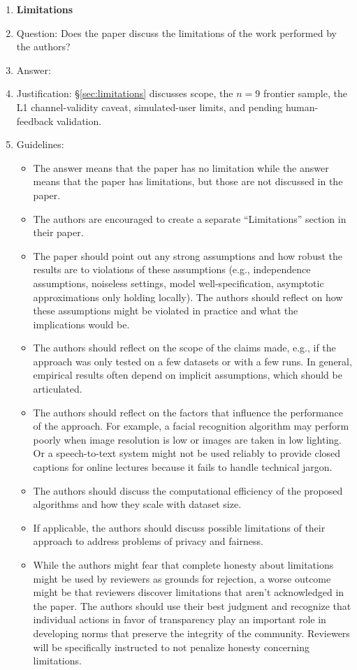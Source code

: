 \documentclass[11pt]{article}
\begin{document}
\begin{enumerate}
\item {\bf Limitations}
    \item[] Question: Does the paper discuss the limitations of the work performed by the authors?
    \item[] Answer: \answerYes{}
    \item[] Justification: \S\ref{sec:limitations} discusses scope, the $n{=}9$ frontier sample, the L1 channel-validity caveat, simulated-user limits, and pending human-feedback validation.
    \item[] Guidelines:
    \begin{itemize}
        \item The answer \answerNA{} means that the paper has no limitation while the answer \answerNo{} means that the paper has limitations, but those are not discussed in the paper.
        \item The authors are encouraged to create a separate ``Limitations'' section in their paper.
        \item The paper should point out any strong assumptions and how robust the results are to violations of these assumptions (e.g., independence assumptions, noiseless settings, model well-specification, asymptotic approximations only holding locally). The authors should reflect on how these assumptions might be violated in practice and what the implications would be.
        \item The authors should reflect on the scope of the claims made, e.g., if the approach was only tested on a few datasets or with a few runs. In general, empirical results often depend on implicit assumptions, which should be articulated.
        \item The authors should reflect on the factors that influence the performance of the approach. For example, a facial recognition algorithm may perform poorly when image resolution is low or images are taken in low lighting. Or a speech-to-text system might not be used reliably to provide closed captions for online lectures because it fails to handle technical jargon.
        \item The authors should discuss the computational efficiency of the proposed algorithms and how they scale with dataset size.
        \item If applicable, the authors should discuss possible limitations of their approach to address problems of privacy and fairness.
        \item While the authors might fear that complete honesty about limitations might be used by reviewers as grounds for rejection, a worse outcome might be that reviewers discover limitations that aren't acknowledged in the paper. The authors should use their best judgment and recognize that individual actions in favor of transparency play an important role in developing norms that preserve the integrity of the community. Reviewers will be specifically instructed to not penalize honesty concerning limitations.
    \end{itemize}


\end{enumerate}
\end{document}
